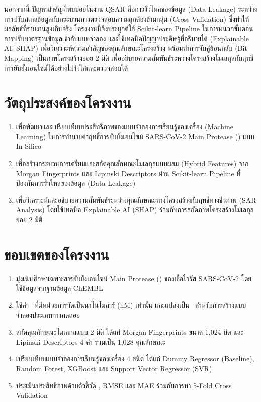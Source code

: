 นอกจากนี้ ปัญหาสำคัญที่พบบ่อยในงาน QSAR คือการรั่วไหลของข้อมูล (Data Leakage) ระหว่างการปรับสเกลข้อมูลกับกระบวนการตรวจสอบความถูกต้องข้ามกลุ่ม (Cross-Validation) ซึ่งทำให้ผลลัพธ์ที่รายงานสูงเกินจริง โครงงานนี้จึงประยุกต์ใช้ Scikit-learn Pipeline ในการผนวกขั้นตอนการปรับมาตรฐานข้อมูลเข้ากับแบบจำลอง และใช้เทคนิคปัญญาประดิษฐ์ที่อธิบายได้ (Explainable AI: SHAP) เพื่อวิเคราะห์ความสำคัญของคุณลักษณะโครงสร้าง พร้อมทำการจับคู่ย้อนกลับ (Bit Mapping) เป็นภาพโครงสร้างย่อย 2 มิติ เพื่ออธิบายความสัมพันธ์ระหว่างโครงสร้างโมเลกุลกับฤทธิ์การยับยั้งเอนไซม์ได้อย่างโปร่งใสและตรวจสอบได้

\section{วัตถุประสงค์ของโครงงาน}

\begin{enumerate}[leftmargin=2em, itemsep=0.5em]
  \item เพื่อพัฒนาและเปรียบเทียบประสิทธิภาพของแบบจำลองการเรียนรู้ของเครื่อง (Machine Learning) ในการทำนายค่าฤทธิ์การยับยั้งเอนไซม์ SARS-CoV-2 Main Protease (\pICfifty) แบบ In Silico
  \item เพื่อสร้างกระบวนการเตรียมและสกัดคุณลักษณะโมเลกุลแบบผสม (Hybrid Features) จาก Morgan Fingerprints และ Lipinski Descriptors ผ่าน Scikit-learn Pipeline ที่ป้องกันการรั่วไหลของข้อมูล (Data Leakage)
  \item เพื่อวิเคราะห์และอธิบายความสัมพันธ์ระหว่างคุณลักษณะทางโครงสร้างกับฤทธิ์ทางชีวภาพ (SAR Analysis) โดยใช้เทคนิค Explainable AI (SHAP) ร่วมกับการสกัดภาพโครงสร้างโมเลกุลย่อย 2 มิติ
\end{enumerate}

\section{ขอบเขตของโครงงาน}

\begin{enumerate}[leftmargin=2em, itemsep=0.4em]
  \item มุ่งเน้นศึกษาเฉพาะสารยับยั้งเอนไซม์ Main Protease (\Mpro) ของเชื้อไวรัส SARS-CoV-2 โดยใช้ข้อมูลจากฐานข้อมูล ChEMBL
  \item ใช้ค่า \ICfifty\ ที่มีหน่วยการวัดเป็นนาโนโมลาร์ (nM) เท่านั้น และแปลงเป็น \pICfifty\ สำหรับการสร้างแบบจำลองประเภทการถดถอย
  \item สกัดคุณลักษณะโมเลกุลแบบ 2 มิติ ได้แก่ Morgan Fingerprints ขนาด 1{,}024 บิต และ Lipinski Descriptors 4 ค่า รวมเป็น 1{,}028 คุณลักษณะ
  \item เปรียบเทียบแบบจำลองการเรียนรู้ของเครื่อง 4 ชนิด ได้แก่ Dummy Regressor (Baseline), Random Forest, XGBoost และ Support Vector Regressor (SVR)
  \item ประเมินประสิทธิภาพด้วยตัวชี้วัด \Rsq, RMSE และ MAE ร่วมกับการทำ 5-Fold Cross Validation
\end{enumerate}

